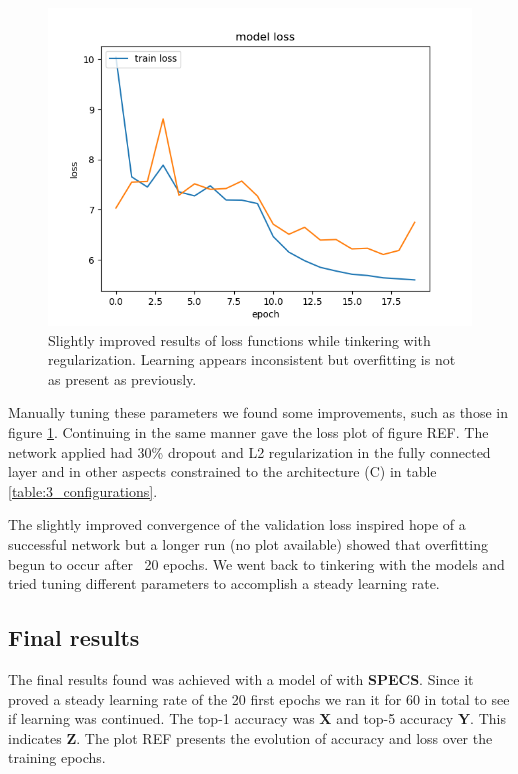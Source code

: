 \documentclass{kthreport}
\begin{document}
\begin{figure}
  \includegraphics[width=\linewidth]{../images/improved_loss_1.png}
  \caption[]
  {\small Slightly improved results of loss functions while tinkering with regularization. Learning appears inconsistent but overfitting is not as present as previously.}
  \label{fig:loss_improved_1}
\end{figure}
Manually tuning these parameters we found some improvements, such as those in figure \ref{fig:loss_improved_1}. Continuing in the same manner gave the loss plot of figure REF. The network applied had 30\% dropout and L2 regularization in the fully connected layer and in other aspects constrained to the architecture (C) in table \ref{table:3_configurations}.

The slightly improved convergence of the validation loss inspired hope of a successful network but a longer run (no plot available) showed that overfitting begun to occur after ~20 epochs. We went back to tinkering with the models and tried tuning different parameters to accomplish a steady learning rate.

% 

\subsection{Final results}

The final results found was achieved with a model of with \textbf{SPECS}. Since it proved a steady learning rate of the 20 first epochs we ran it for 60 in total to see if learning was continued. The top-1 accuracy was \textbf{X} and top-5 accuracy \textbf{Y}. This indicates \textbf{Z}. The plot REF presents the evolution of accuracy and loss over the training epochs.
\end{document}

